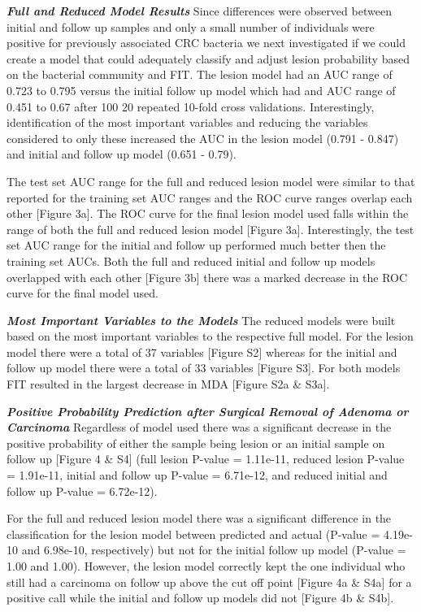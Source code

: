 \documentclass[12pt,]{article}
\begin{document}
\textbf{\emph{Full and Reduced Model Results}} Since differences were
observed between initial and follow up samples and only a small number
of individuals were positive for previously associated CRC bacteria we
next investigated if we could create a model that could adequately
classify and adjust lesion probability based on the bacterial community
and FIT. The lesion model had an AUC range of 0.723 to 0.795 versus the
initial follow up model which had and AUC range of 0.451 to 0.67 after
100 20 repeated 10-fold cross validations. Interestingly, identification
of the most important variables and reducing the variables considered to
only these increased the AUC in the lesion model (0.791 - 0.847) and
initial and follow up model (0.651 - 0.79).

The test set AUC range for the full and reduced lesion model were
similar to that reported for the training set AUC ranges and the ROC
curve ranges overlap each other {[}Figure 3a{]}. The ROC curve for the
final lesion model used falls within the range of both the full and
reduced lesion model {[}Figure 3a{]}. Interestingly, the test set AUC
range for the initial and follow up performed much better then the
training set AUCs. Both the full and reduced initial and follow up
models overlapped with each other {[}Figure 3b{]} there was a marked
decrease in the ROC curve for the final model used.

\textbf{\emph{Most Important Variables to the Models}} The reduced
models were built based on the most important variables to the
respective full model. For the lesion model there were a total of 37
variables {[}Figure S2{]} whereas for the initial and follow up model
there were a total of 33 variables {[}Figure S3{]}. For both models FIT
resulted in the largest decrease in MDA {[}Figure S2a \& S3a{]}.

\textbf{\emph{Positive Probability Prediction after Surgical Removal of
Adenoma or Carcinoma}} Regardless of model used there was a significant
decrease in the positive probability of either the sample being lesion
or an initial sample on follow up {[}Figure 4 \& S4{]} (full lesion
P-value = 1.11e-11, reduced lesion P-value = 1.91e-11, initial and
follow up P-value = 6.71e-12, and reduced initial and follow up P-value
= 6.72e-12).

For the full and reduced lesion model there was a significant difference
in the classification for the lesion model between predicted and actual
(P-value = 4.19e-10 and 6.98e-10, respectively) but not for the initial
follow up model (P-value = 1.00 and 1.00). However, the lesion model
correctly kept the one individual who still had a carcinoma on follow up
above the cut off point {[}Figure 4a \& S4a{]} for a positive call while
the initial and follow up models did not {[}Figure 4b \& S4b{]}.
\end{document}
